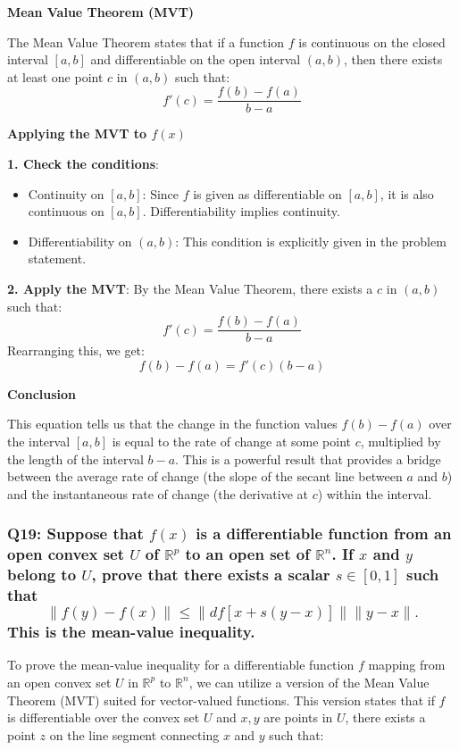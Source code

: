 \documentclass[8pt]{article}
\begin{document}
\textbf{Mean Value Theorem (MVT)}

The Mean Value Theorem states that if a function \( f \) is continuous on the closed interval \([a, b]\) and differentiable on the open interval \((a, b)\), then there exists at least one point \( c \) in \((a, b)\) such that:
\[ f'(c) = \frac{f(b) - f(a)}{b - a} \]

\textbf{Applying the MVT to \( f(x) \)}

\textbf{1. Check the conditions}:
   \begin{itemize}
       \item Continuity on \([a, b]\): Since \( f \) is given as differentiable on \([a, b]\), it is also continuous on \([a, b]\). Differentiability implies continuity.
       \item Differentiability on \((a, b)\): This condition is explicitly given in the problem statement.
   \end{itemize}

\textbf{2. Apply the MVT}:
   By the Mean Value Theorem, there exists a \( c \) in \((a, b)\) such that:
   \[ f'(c) = \frac{f(b) - f(a)}{b - a} \]
   Rearranging this, we get:
   \[ f(b) - f(a) = f'(c)(b - a) \]

\textbf{Conclusion}

This equation tells us that the change in the function values \( f(b) - f(a) \) over the interval \([a, b]\) is equal to the rate of change at some point \( c \), multiplied by the length of the interval \( b - a \). This is a powerful result that provides a bridge between the average rate of change (the slope of the secant line between \( a \) and \( b \)) and the instantaneous rate of change (the derivative at \( c \)) within the interval.

\subsubsection*{Q19: Suppose that \( f(x) \) is a differentiable function from an open convex set \( U \) of \( \mathbb{R}^p \) to an open set of \( \mathbb{R}^n \). If \( x \) and \( y \) belong to \( U \), prove that there exists a scalar \( s \in [0, 1] \) such that
\[
\| f(y) - f(x) \| \leq \| df[x + s(y - x)] \| \| y - x \|.
\]
This is the mean-value inequality.}

To prove the mean-value inequality for a differentiable function \( f \) mapping from an open convex set \( U \) in \( \mathbb{R}^p \) to \( \mathbb{R}^n \), we can utilize a version of the Mean Value Theorem (MVT) suited for vector-valued functions. This version states that if \( f \) is differentiable over the convex set \( U \) and \( x, y \) are points in \( U \), there exists a point \( z \) on the line segment connecting \( x \) and \( y \) such that:
\end{document}
